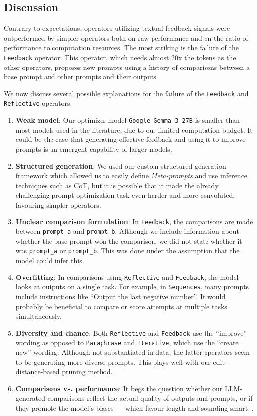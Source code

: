 \subsection{Discussion}

Contrary to expectations, operators utilizing textual feedback signals were outperformed by simpler operators
both on raw performance and on the ratio of performance to computation resources.
The most striking is the failure of the \texttt{Feedback} operator. This operator, which needs almost 20x the tokens as the other operators,
proposes new prompts using a history of comparisons between a base prompt and other prompts and their outputs. 

We now discuss several possible explanations for the failure of the \texttt{Feedback} and \texttt{Reflective} operators.
\begin{enumerate}
    \item \textbf{Weak model}: Our optimizer model \texttt{Google Gemma 3 27B} is smaller than most models used in the literature, due to our limited computation budget. It could be the case that generating effective feedback and using it to improve prompts is an emergent capability of larger models.
    \item \textbf{Structured generation}: We used our custom structured generation framework which allowed us to easily define \textit{Meta-prompts} and use inference techniques such as CoT, but it is possible that it made the already challenging prompt optimization task even harder and more convoluted, favouring simpler operators.
    \item \textbf{Unclear comparison formulation}: In \texttt{Feedback}, the comparisons are made between \texttt{prompt\_a} and \texttt{prompt\_b}. Although we include information about whether the base prompt won the comparison, we did not state whether it was \texttt{prompt\_a} or \texttt{prompt\_b}. This was done under the assumption that the model could infer this.
    \item \textbf{Overfitting}: In comparisons using \texttt{Reflective} and \texttt{Feedback}, the model looks at outputs on a single task. For example, in \texttt{Sequences}, many prompts include instructions like ``Output the last negative number''. It would probably be beneficial to compare or score attempts at multiple tasks simultaneously.
    \item \textbf{Diversity and chance}: Both \texttt{Reflective} and \texttt{Feedback} use the ``improve'' wording as opposed to \texttt{Paraphrase} and \texttt{Iterative}, which use the ``create new'' wording. Although not substantiated in data, the latter operators seem to be generating more diverse prompts. This plays well with our edit-distance-based pruning method.
    \item \textbf{Comparisons vs. performance}: It begs the question whether our LLM-generated comparisons reflect the actual quality of outputs and prompts, or if they promote the model's biases — which favour length and sounding smart~\cite{ye2024justiceprejudicequantifyingbiases}.
\end{enumerate}

